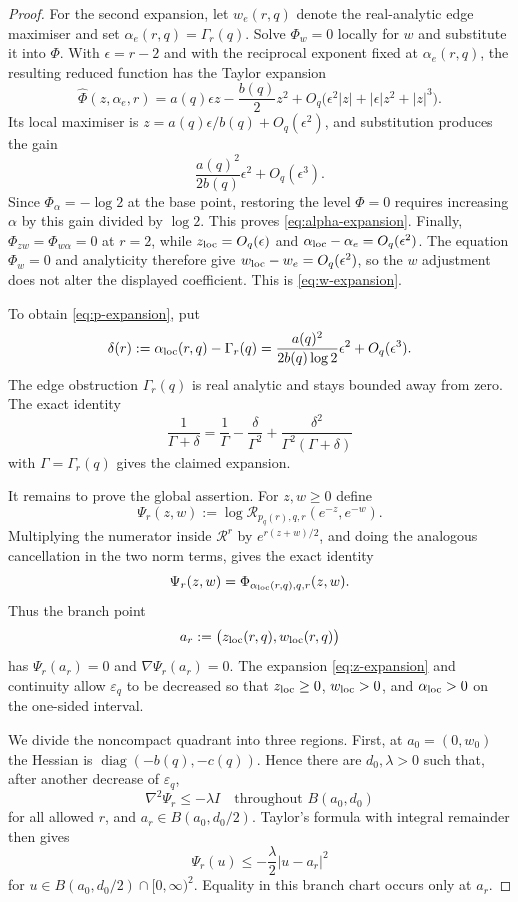 \documentclass[11pt,reqno]{amsart}
\numberwithin{equation}{section}
\theoremstyle{definition}
\theoremstyle{remark}
\begin{document}
\begin{proof}
For the second expansion, let $w_e(r,q)$ denote the real-analytic edge maximiser and
set $\alpha_e(r,q)=\Gamma_r(q)$.  Solve $\Phi_w=0$ locally for $w$ and
substitute it into $\Phi$.  With $\epsilon=r-2$ and with the reciprocal
exponent fixed at $\alpha_e(r,q)$, the resulting reduced function has the
Taylor expansion
\[
  \widehat\Phi(z,\alpha_e,r)
  =a(q)\epsilon z-\frac{b(q)}2z^2
  +O_q\bigl(\epsilon^2|z|+|\epsilon|z^2+|z|^3\bigr).
\]
Its local maximiser is
$z=a(q)\epsilon/b(q)+O_q(\epsilon^2)$, and substitution produces the gain
\[
  \frac{a(q)^2}{2b(q)}\epsilon^2+O_q(\epsilon^3).
\]
Since $\Phi_\alpha=-\log2$ at the base point, restoring the level
$\Phi=0$ requires increasing $\alpha$ by this gain divided by $\log2$.  This
proves \eqref{eq:alpha-expansion}.  Finally,
$\Phi_{zw}=\Phi_{w\alpha}=0$ at $r=2$, while
$z_{\rm loc}=O_q(\epsilon)$ and
$\alpha_{\rm loc}-\alpha_e=O_q(\epsilon^2)$.  The equation $\Phi_w=0$ and
analyticity therefore give $w_{\rm loc}-w_e=O_q(\epsilon^2)$, so the $w$
adjustment does not alter the displayed coefficient.  This is
\eqref{eq:w-expansion}.

To obtain \eqref{eq:p-expansion}, put
\[
  \delta(r):=\alpha_{\rm loc}(r,q)-\Gamma_r(q)
  =\frac{a(q)^2}{2b(q)\log2}\epsilon^2+O_q(\epsilon^3).
\]
The edge obstruction $\Gamma_r(q)$ is real analytic and stays bounded away
from zero.  The exact identity
\[
  \frac1{\Gamma+\delta}
  =\frac1\Gamma-\frac{\delta}{\Gamma^2}
  +\frac{\delta^2}{\Gamma^2(\Gamma+\delta)}
\]
with $\Gamma=\Gamma_r(q)$ gives the claimed expansion.

It remains to prove the global assertion.  For $z,w\ge0$ define
\[
  \Psi_r(z,w)
  :=\log\mathcal R_{p_q(r),q,r}(e^{-z},e^{-w}).
\]
Multiplying the numerator inside $\mathcal R^r$ by
$e^{r(z+w)/2}$, and doing the analogous cancellation in the two norm terms,
gives the exact identity
\begin{equation}\label{eq:Psi-Phi-identity}
  \Psi_r(z,w)
  =\Phi_{\alpha_{\rm loc}(r,q),q,r}(z,w).
\end{equation}
Thus the branch point
\[
  a_r:=\bigl(z_{\rm loc}(r,q),w_{\rm loc}(r,q)\bigr)
\]
has $\Psi_r(a_r)=0$ and $\nabla\Psi_r(a_r)=0$.  The expansion
\eqref{eq:z-expansion} and continuity allow $\varepsilon_q$ to be decreased so
that $z_{\rm loc}\ge0$, $w_{\rm loc}>0$, and $\alpha_{\rm loc}>0$ on the
one-sided interval.

We divide the noncompact quadrant into three regions.  First, at
$a_0=(0,w_0)$ the Hessian is
$\operatorname{diag}(-b(q),-c(q))$.  Hence there are $d_0,\lambda>0$ such that,
after another decrease of $\varepsilon_q$,
\[
  \nabla^2\Psi_r\le-\lambda I
  \quad\text{throughout }B(a_0,d_0)
\]
for all allowed $r$, and $a_r\in B(a_0,d_0/2)$.  Taylor's formula with integral
remainder then gives
\begin{equation}\label{eq:branch-chart-concavity}
  \Psi_r(u)\le-\frac{\lambda}{2}|u-a_r|^2
\end{equation}
for $u\in B(a_0,d_0/2)\cap[0,\infty)^2$.  Equality in this branch chart occurs
only at $a_r$.


\end{proof}
\end{document}
